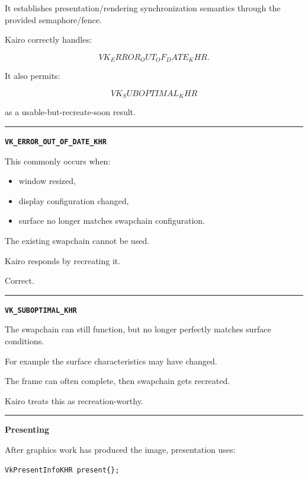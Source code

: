 It establishes presentation/rendering synchronization semantics through the provided semaphore/fence.

Kairo correctly handles:

\[
VK_ERROR_OUT_OF_DATE_KHR.
\]

It also permits:

\[
VK_SUBOPTIMAL_KHR
\]

as a usable-but-recreate-soon result.

\begin{center}\rule{0.5\linewidth}{0.5pt}\end{center}

\textbf{\texttt{VK\_ERROR\_OUT\_OF\_DATE\_KHR}}

This commonly occurs when:

\begin{itemize}
\tightlist
\item
  window resized,
\item
  display configuration changed,
\item
  surface no longer matches swapchain configuration.
\end{itemize}

The existing swapchain cannot be used.

Kairo responds by recreating it.

Correct.

\begin{center}\rule{0.5\linewidth}{0.5pt}\end{center}

\textbf{\texttt{VK\_SUBOPTIMAL\_KHR}}

The swapchain can still function, but no longer perfectly matches surface conditions.

For example the surface characteristics may have changed.

The frame can often complete, then swapchain gets recreated.

Kairo treats this as recreation-worthy.

\begin{center}\rule{0.5\linewidth}{0.5pt}\end{center}

\textbf{Presenting}

After graphics work has produced the image, presentation uses:

\begin{verbatim}
VkPresentInfoKHR present{};
\end{verbatim}

